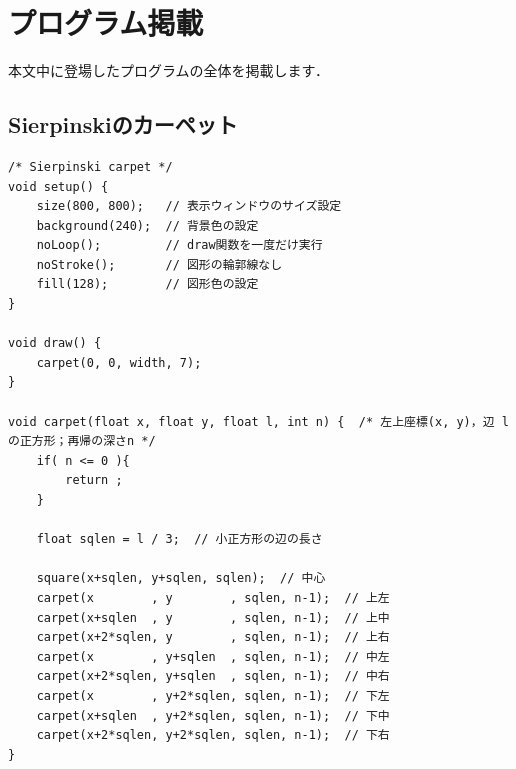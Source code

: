 \documentclass[dvipdfmx]{jsarticle}
\theoremstyle{definition}
\begin{document}
\appendix


\section{プログラム掲載}  \label{sec_program}
本文中に登場したプログラムの全体を掲載します．

\subsection{Sierpinskiのカーペット}  \label{subsec_code_carpet}
\begin{lstlisting}[caption=Sierpinskiのカーペット, label=code_carpet_all]
/* Sierpinski carpet */
void setup() {
    size(800, 800);   // 表示ウィンドウのサイズ設定
    background(240);  // 背景色の設定
    noLoop();         // draw関数を一度だけ実行
    noStroke();       // 図形の輪郭線なし
    fill(128);        // 図形色の設定
}

void draw() {
    carpet(0, 0, width, 7);
}

void carpet(float x, float y, float l, int n) {  /* 左上座標(x, y)，辺 lの正方形；再帰の深さn */
    if( n <= 0 ){
        return ;
    }

    float sqlen = l / 3;  // 小正方形の辺の長さ

    square(x+sqlen, y+sqlen, sqlen);  // 中心
    carpet(x        , y        , sqlen, n-1);  // 上左
    carpet(x+sqlen  , y        , sqlen, n-1);  // 上中
    carpet(x+2*sqlen, y        , sqlen, n-1);  // 上右
    carpet(x        , y+sqlen  , sqlen, n-1);  // 中左
    carpet(x+2*sqlen, y+sqlen  , sqlen, n-1);  // 中右
    carpet(x        , y+2*sqlen, sqlen, n-1);  // 下左
    carpet(x+sqlen  , y+2*sqlen, sqlen, n-1);  // 下中
    carpet(x+2*sqlen, y+2*sqlen, sqlen, n-1);  // 下右
}
\end{lstlisting}
\clearpage

\end{document}
